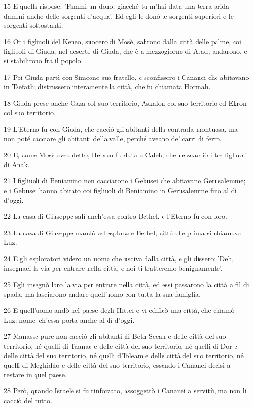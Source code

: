 \par 15 E quella rispose: 'Fammi un dono; giacché tu m'hai data una terra arida dammi anche delle sorgenti d'acqua'. Ed egli le donò le sorgenti superiori e le sorgenti sottostanti.
\par 16 Or i figliuoli del Keneo, suocero di Mosè, salirono dalla città delle palme, coi figliuoli di Giuda, nel deserto di Giuda, che è a mezzogiorno di Arad; andarono, e si stabilirono fra il popolo.
\par 17 Poi Giuda partì con Simeone suo fratello, e sconfissero i Cananei che abitavano in Tsefath; distrussero interamente la città, che fu chiamata Hormah.
\par 18 Giuda prese anche Gaza col suo territorio, Askalon col suo territorio ed Ekron col suo territorio.
\par 19 L'Eterno fu con Giuda, che cacciò gli abitanti della contrada montuosa, ma non poté cacciare gli abitanti della valle, perché aveano de' carri di ferro.
\par 20 E, come Mosè avea detto, Hebron fu data a Caleb, che ne scacciò i tre figliuoli di Anak.
\par 21 I figliuoli di Beniamino non cacciarono i Gebusei che abitavano Gerusalemme; e i Gebusei hanno abitato coi figliuoli di Beniamino in Gerusalemme fino al dì d'oggi.
\par 22 La casa di Giuseppe salì anch'essa contro Bethel, e l'Eterno fu con loro.
\par 23 La casa di Giuseppe mandò ad esplorare Bethel, città che prima si chiamava Luz.
\par 24 E gli esploratori videro un uomo che usciva dalla città, e gli dissero: 'Deh, insegnaci la via per entrare nella città, e noi ti tratteremo benignamente'.
\par 25 Egli insegnò loro la via per entrare nella città, ed essi passarono la città a fil di spada, ma lasciarono andare quell'uomo con tutta la sua famiglia.
\par 26 E quell'uomo andò nel paese degli Hittei e vi edificò una città, che chiamò Luz: nome, ch'essa porta anche al dì d'oggi.
\par 27 Manasse pure non cacciò gli abitanti di Beth-Scean e delle città del suo territorio, né quelli di Taanac e delle città del suo territorio, né quelli di Dor e delle città del suo territorio, né quelli d'Ibleam e delle città del suo territorio, né quelli di Meghiddo e delle città del suo territorio, essendo i Cananei decisi a restare in quel paese.
\par 28 Però, quando Israele si fu rinforzato, assoggettò i Cananei a servitù, ma non li cacciò del tutto.

